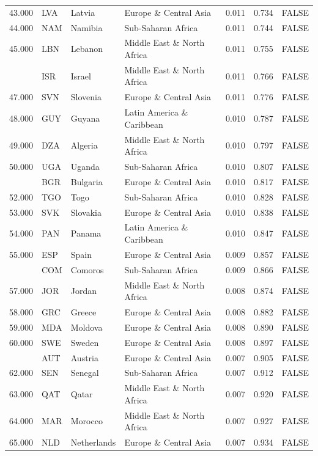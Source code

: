 \begin{table}
\begin{tabular}[t]{lllllll}
43.000 & LVA & Latvia & Europe \& Central Asia & 0.011 & 0.734 & FALSE\\
44.000 & NAM & Namibia & Sub-Saharan Africa & 0.011 & 0.744 & FALSE\\
45.000 & LBN & Lebanon & Middle East \& North Africa & 0.011 & 0.755 & FALSE\\
\addlinespace
46.000 & ISR & Israel & Middle East \& North Africa & 0.011 & 0.766 & FALSE\\
47.000 & SVN & Slovenia & Europe \& Central Asia & 0.011 & 0.776 & FALSE\\
48.000 & GUY & Guyana & Latin America \& Caribbean & 0.010 & 0.787 & FALSE\\
49.000 & DZA & Algeria & Middle East \& North Africa & 0.010 & 0.797 & FALSE\\
50.000 & UGA & Uganda & Sub-Saharan Africa & 0.010 & 0.807 & FALSE\\
\addlinespace
51.000 & BGR & Bulgaria & Europe \& Central Asia & 0.010 & 0.817 & FALSE\\
52.000 & TGO & Togo & Sub-Saharan Africa & 0.010 & 0.828 & FALSE\\
53.000 & SVK & Slovakia & Europe \& Central Asia & 0.010 & 0.838 & FALSE\\
54.000 & PAN & Panama & Latin America \& Caribbean & 0.010 & 0.847 & FALSE\\
55.000 & ESP & Spain & Europe \& Central Asia & 0.009 & 0.857 & FALSE\\
\addlinespace
56.000 & COM & Comoros & Sub-Saharan Africa & 0.009 & 0.866 & FALSE\\
57.000 & JOR & Jordan & Middle East \& North Africa & 0.008 & 0.874 & FALSE\\
58.000 & GRC & Greece & Europe \& Central Asia & 0.008 & 0.882 & FALSE\\
59.000 & MDA & Moldova & Europe \& Central Asia & 0.008 & 0.890 & FALSE\\
60.000 & SWE & Sweden & Europe \& Central Asia & 0.008 & 0.897 & FALSE\\
\addlinespace
61.000 & AUT & Austria & Europe \& Central Asia & 0.007 & 0.905 & FALSE\\
62.000 & SEN & Senegal & Sub-Saharan Africa & 0.007 & 0.912 & FALSE\\
63.000 & QAT & Qatar & Middle East \& North Africa & 0.007 & 0.920 & FALSE\\
64.000 & MAR & Morocco & Middle East \& North Africa & 0.007 & 0.927 & FALSE\\
65.000 & NLD & Netherlands & Europe \& Central Asia & 0.007 & 0.934 & FALSE\\

\end{tabular}
\end{table}
